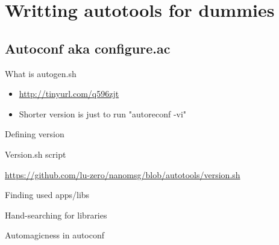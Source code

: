 \documentclass{beamer}
\begin{document}
\section{Writting autotools for dummies}

\subsection{Autoconf aka configure.ac}

\begin{frame}[t]{What is autogen.sh}
	\begin{itemize}
	\item \url{http://tinyurl.com/q596zjt} \\
	\item Shorter version is just to run "autoreconf -vi"
	\end{itemize}
\end{frame}

\begin{frame}[t]{Defining version}
	\begin{small}
	
	\end{small}
\end{frame}

\begin{frame}{Version.sh script}
	\begin{small}
	\url{https://github.com/lu-zero/nanomsg/blob/autotools/version.sh}
	\end{small}
\end{frame}

\begin{frame}[t]{Finding used apps/libs}
	\begin{small}
	
	\end{small}
\end{frame}

\begin{frame}[t]{Hand-searching for libraries}
	\begin{small}
	
	\end{small}
\end{frame}

\begin{frame}[t]{Automagicness in autoconf}
	\begin{small}
	
	\end{small}
\end{frame}
\end{document}
